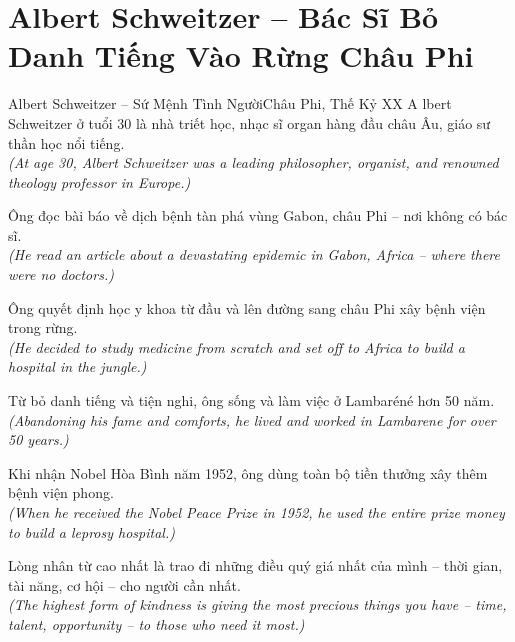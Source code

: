 \section{Albert Schweitzer -- Bác Sĩ Bỏ Danh Tiếng Vào Rừng Châu Phi}
\begin{truyen}{Albert Schweitzer -- Sứ Mệnh Tình Người}{Châu Phi, Thế Kỷ XX}
A lbert Schweitzer ở tuổi 30 là nhà triết học, nhạc sĩ organ hàng đầu châu Âu, giáo sư thần học nổi tiếng.\\
\textit{(At age 30, Albert Schweitzer was a leading philosopher, organist, and renowned theology professor in Europe.)}

Ông đọc bài báo về dịch bệnh tàn phá vùng Gabon, châu Phi -- nơi không có bác sĩ.\\
\textit{(He read an article about a devastating epidemic in Gabon, Africa -- where there were no doctors.)}

Ông quyết định học y khoa từ đầu và lên đường sang châu Phi xây bệnh viện trong rừng.\\
\textit{(He decided to study medicine from scratch and set off to Africa to build a hospital in the jungle.)}

Từ bỏ danh tiếng và tiện nghi, ông sống và làm việc ở Lambaréné hơn 50 năm.\\
\textit{(Abandoning his fame and comforts, he lived and worked in Lambarene for over 50 years.)}

Khi nhận Nobel Hòa Bình năm 1952, ông dùng toàn bộ tiền thưởng xây thêm bệnh viện phong.\\
\textit{(When he received the Nobel Peace Prize in 1952, he used the entire prize money to build a leprosy hospital.)}

\end{truyen}
\begin{baihoc}
  Lòng nhân từ cao nhất là trao đi những điều quý giá nhất của mình -- thời gian, tài năng, cơ hội -- cho người cần nhất.\\
  \textit{(The highest form of kindness is giving the most precious things you have -- time, talent, opportunity -- to those who need it most.)}
\end{baihoc}

